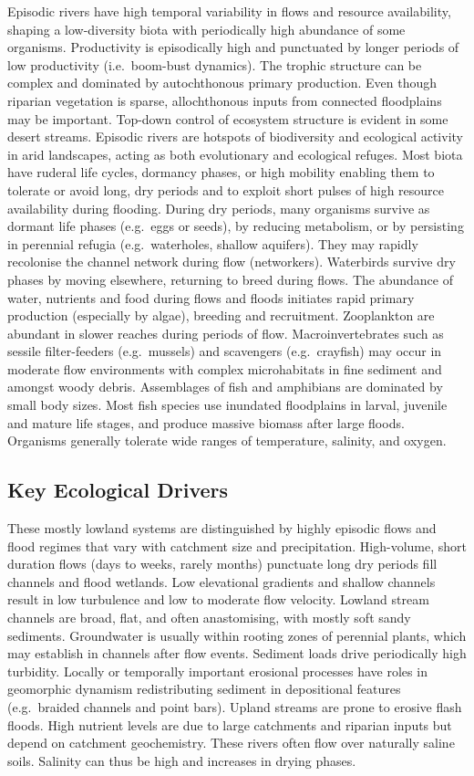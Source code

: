 \documentclass[
  letterpaper,
  DIV=11,
  numbers=noendperiod]{scrartcl}
\begin{document}
Episodic rivers have high temporal variability in flows and resource
availability, shaping a low-diversity biota with periodically high
abundance of some organisms. Productivity is episodically high and
punctuated by longer periods of low productivity (i.e.~boom-bust
dynamics). The trophic structure can be complex and dominated by
autochthonous primary production. Even though riparian vegetation is
sparse, allochthonous inputs from connected floodplains may be
important. Top-down control of ecosystem structure is evident in some
desert streams. Episodic rivers are hotspots of biodiversity and
ecological activity in arid landscapes, acting as both evolutionary and
ecological refuges. Most biota have ruderal life cycles, dormancy
phases, or high mobility enabling them to tolerate or avoid long, dry
periods and to exploit short pulses of high resource availability during
flooding. During dry periods, many organisms survive as dormant life
phases (e.g.~eggs or seeds), by reducing metabolism, or by persisting in
perennial refugia (e.g.~waterholes, shallow aquifers). They may rapidly
recolonise the channel network during flow (networkers). Waterbirds
survive dry phases by moving elsewhere, returning to breed during flows.
The abundance of water, nutrients and food during flows and floods
initiates rapid primary production (especially by algae), breeding and
recruitment. Zooplankton are abundant in slower reaches during periods
of flow. Macroinvertebrates such as sessile filter-feeders
(e.g.~mussels) and scavengers (e.g.~crayfish) may occur in moderate flow
environments with complex microhabitats in fine sediment and amongst
woody debris. Assemblages of fish and amphibians are dominated by small
body sizes. Most fish species use inundated floodplains in larval,
juvenile and mature life stages, and produce massive biomass after large
floods. Organisms generally tolerate wide ranges of temperature,
salinity, and oxygen.

\subsection{Key Ecological Drivers}\label{key-ecological-drivers-114}

These mostly lowland systems are distinguished by highly episodic flows
and flood regimes that vary with catchment size and precipitation.
High-volume, short duration flows (days to weeks, rarely months)
punctuate long dry periods fill channels and flood wetlands. Low
elevational gradients and shallow channels result in low turbulence and
low to moderate flow velocity. Lowland stream channels are broad, flat,
and often anastomising, with mostly soft sandy sediments. Groundwater is
usually within rooting zones of perennial plants, which may establish in
channels after flow events. Sediment loads drive periodically high
turbidity. Locally or temporally important erosional processes have
roles in geomorphic dynamism redistributing sediment in depositional
features (e.g.~braided channels and point bars). Upland streams are
prone to erosive flash floods. High nutrient levels are due to large
catchments and riparian inputs but depend on catchment geochemistry.
These rivers often flow over naturally saline soils. Salinity can thus
be high and increases in drying phases.
\end{document}
